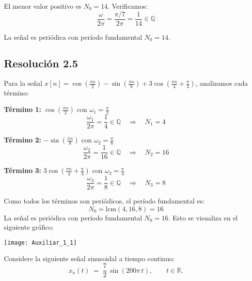 \documentclass[
  11pt,
  letterpaper,
   addpoints,
  ]{exam}
\begin{document}
\begin{questions}
\begin{solution}
El menor valor positivo es $N_0 = 14$. Verificamos:
\begin{equation}
\frac{\omega}{2\pi} = \frac{\pi/7}{2\pi} = \frac{1}{14} \in \mathbb{Q}
\end{equation}

La señal es periódica con período fundamental $\boxed{N_0 = 14}$.

\subsection*{Resolución 2.5}

Para la señal $x[n] = \cos\!\left(\tfrac{\pi n}{2}\right) - \sin\!\left(\tfrac{\pi n}{8}\right) + 3\cos\!\left(\tfrac{\pi n}{4}+\tfrac{\pi}{3}\right)$, analizamos cada término:

\textbf{Término 1:} $\cos\!\left(\tfrac{\pi n}{2}\right)$ con $\omega_1 = \frac{\pi}{2}$
\begin{equation}
\frac{\omega_1}{2\pi} = \frac{1}{4} \in \mathbb{Q} \quad \Rightarrow \quad N_1 = 4
\end{equation}

\textbf{Término 2:} $-\sin\!\left(\tfrac{\pi n}{8}\right)$ con $\omega_2 = \frac{\pi}{8}$
\begin{equation}
\frac{\omega_2}{2\pi} = \frac{1}{16} \in \mathbb{Q} \quad \Rightarrow \quad N_2 = 16
\end{equation}

\textbf{Término 3:} $3\cos\!\left(\tfrac{\pi n}{4}+\tfrac{\pi}{3}\right)$ con $\omega_3 = \frac{\pi}{4}$
\begin{equation}
\frac{\omega_3}{2\pi} = \frac{1}{8} \in \mathbb{Q} \quad \Rightarrow \quad N_3 = 8
\end{equation}

Como todos los términos son periódicos, el período fundamental es:
\begin{equation}
N_0 = \text{lcm}(4, 16, 8) = 16
\end{equation}
La señal es periódica con período fundamental $\boxed{N_0 = 16}$. Esto se visualiza en el siguiente gráfico:
\begin{center}
  \texttt{[image: Auxiliar\_1\_1]}
\end{center}

\end{solution}

\question Considere la siguiente señal sinusoidal a tiempo continuo:
\begin{equation}
  x_a(t) \;=\; \frac{7}{2}\,\sin(200\pi\,t), 
  \qquad t \in \mathbb{R}.
\end{equation}


\end{questions}
\end{document}

